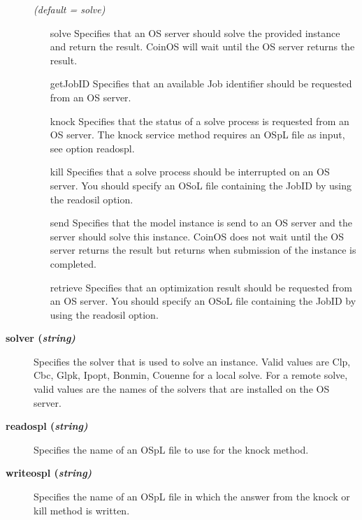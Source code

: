\begin{description}
\textsl{(default = solve)}
\begin{itemize}
\item[solve] 
Specifies that an OS server should solve the provided instance and return the result.
CoinOS will wait until the OS server returns the result.
\item[getJobID] 
Specifies that an available Job identifier should be requested from an OS server.
\item[knock] 
Specifies that the status of a solve process is requested from an OS server.
The knock service method requires an OSpL file as input, see option readospl.
\item[kill] 
Specifies that a solve process should be interrupted on an OS server.
You should specify an OSoL file containing the JobID by using the readosil option.
\item[send] 
Specifies that the model instance is send to an OS server and the server should solve this instance.
CoinOS does not wait until the OS server returns the result but returns when submission of the instance is completed.
\item[retrieve] 
Specifies that an optimization result should be requested from an OS server.
You should specify an OSoL file containing the JobID by using the readosil option.
\end{itemize}

\item[\label{solver}\hypertarget{solver}
{\textbf{solver (\slshape{string})}}]\hspace{1.0in}

Specifies the solver that is used to solve an instance.
Valid values are Clp, Cbc, Glpk, Ipopt, Bonmin, Couenne for a local solve.
For a remote solve, valid values are the names of the solvers that are installed on the OS server.


\item[\label{readospl}\hypertarget{readospl}
{\textbf{readospl (\slshape{string})}}]\hspace{1.0in}

Specifies the name of an OSpL file to use for the knock method.


\item[\label{writeospl}\hypertarget{writeospl}
{\textbf{writeospl (\slshape{string})}}]\hspace{1.0in}

Specifies the name of an OSpL file in which the answer from the knock or kill method is written.

\end{description}

